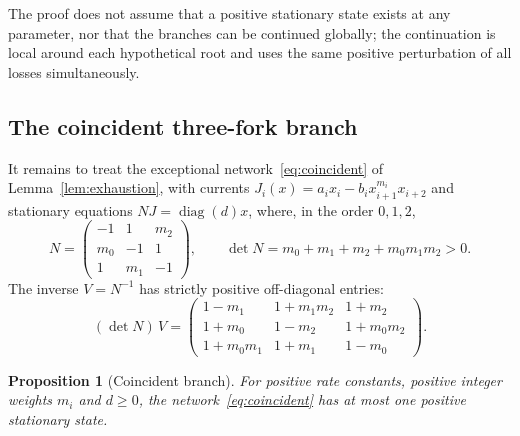\documentclass[11pt,a4paper]{article}
\theoremstyle{plain}
\newtheorem{proposition}[theorem]{Proposition}
\theoremstyle{definition}
\theoremstyle{remark}
\numberwithin{equation}{section}
\newcommand{\diag}{\operatorname{diag}}
\begin{document}
The proof does not assume that a positive stationary state exists at any parameter, nor that the branches can be continued globally; the continuation is local around each hypothetical root and uses the same positive perturbation of all losses simultaneously.

\subsection{The coincident three-fork branch}
It remains to treat the exceptional network~\eqref{eq:coincident} of Lemma~\ref{lem:exhaustion}, with currents $J_i(x)=a_ix_i-b_ix_{i+1}^{m_i}x_{i+2}$ and stationary equations $NJ=\diag(d)x$, where, in the order $0,1,2$,
\[
N=\begin{pmatrix}-1&1&m_2\\ m_0&-1&1\\ 1&m_1&-1\end{pmatrix},\qquad
\det N=m_0+m_1+m_2+m_0m_1m_2>0 .
\]
The inverse $V=N^{-1}$ has strictly positive off-diagonal entries:
\begin{equation}\label{eq:inverse}
(\det N)\,V=\begin{pmatrix}
1-m_1&1+m_1m_2&1+m_2\\
1+m_0&1-m_2&1+m_0m_2\\
1+m_0m_1&1+m_1&1-m_0
\end{pmatrix}.
\end{equation}

\begin{proposition}[Coincident branch]\label{prop:coincident}
For positive rate constants, positive integer weights $m_i$ and $d\ge0$, the network~\eqref{eq:coincident} has at most one positive stationary state.
\end{proposition}
\end{document}
